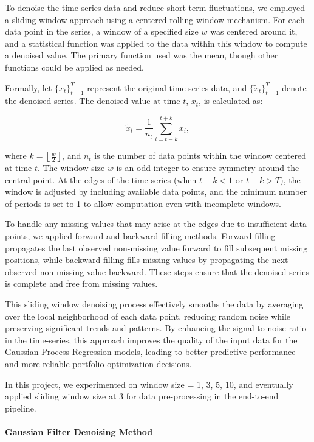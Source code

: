 To denoise the time-series data and reduce short-term fluctuations, we employed a sliding window approach using a centered rolling window mechanism. For each data point in the series, a window of a specified size $w$ was centered around it, and a statistical function was applied to the data within this window to compute a denoised value. The primary function used was the mean, though other functions could be applied as needed.

Formally, let $\{ x_t \}_{t=1}^T$ represent the original time-series data, and $\{ \tilde{x}_t \}_{t=1}^T$ denote the denoised series. The denoised value at time $t$, $\tilde{x}_t$, is calculated as:

\begin{equation}
\tilde{x}_t = \frac{1}{n_t} \sum_{i = t - k}^{t + k} x_i,
\end{equation}

where $k = \left\lfloor \frac{w}{2} \right\rfloor$, and $n_t$ is the number of data points within the window centered at time $t$. The window size $w$ is an odd integer to ensure symmetry around the central point. At the edges of the time-series (when $t - k < 1$ or $t + k > T$), the window is adjusted by including available data points, and the minimum number of periods is set to 1 to allow computation even with incomplete windows.

To handle any missing values that may arise at the edges due to insufficient data points, we applied forward and backward filling methods. Forward filling propagates the last observed non-missing value forward to fill subsequent missing positions, while backward filling fills missing values by propagating the next observed non-missing value backward. These steps ensure that the denoised series is complete and free from missing values.

This sliding window denoising process effectively smooths the data by averaging over the local neighborhood of each data point, reducing random noise while preserving significant trends and patterns. By enhancing the signal-to-noise ratio in the time-series, this approach improves the quality of the input data for the Gaussian Process Regression models, leading to better predictive performance and more reliable portfolio optimization decisions.

In this project, we experimented on window size = 1, 3, 5, 10, and eventually applied sliding window size at 3 for data pre-processing in the end-to-end pipeline.
\paragraph{Gaussian Filter Denoising Method}

